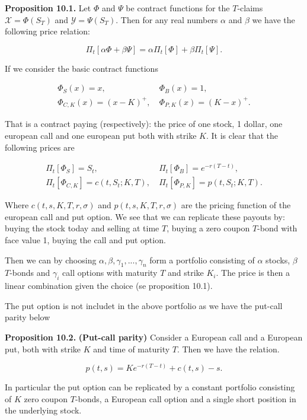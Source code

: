 \documentclass[
]{article}
\begin{document}
\textbf{Proposition 10.1.} Let \(\Phi\) and \(\Psi\) be contract
functions for the \(T\)-claims \(\mathcal{X}=\Phi(S_T)\) and
\(\mathcal{Y}=\Psi(S_T)\). Then for any real numbers \(\alpha\) and
\(\beta\) we have the following price relation:

\[
\Pi_t[\alpha \Phi + \beta\Psi]=\alpha \Pi_t[\Phi]+\beta\Pi_t[\Psi].
\]

If we consider the basic contract functions

\begin{align*}
\Phi_S(x)=x,&\ \Phi_B(x)=1,\\
\Phi_{C,K}(x)=(x-K)^+,&\ \Phi_{P,K}(x)=(K-x)^+.
\end{align*}

That is a contract paying (respectively): the price of one stock, 1
dollar, one european call and one european put both with strike \(K\).
It is clear that the following prices are

\begin{align*}
\Pi_t[\Phi_S]=S_t,&\ \Pi_t[\Phi_B]=e^{-r(T-t)},\\
\Pi_t[\Phi_{C,K}]=c(t,S_t;K,T),&\ \Pi_t[\Phi_{P,K}]=p(t,S_t;K,T).
\end{align*}

Where \(c(t,s,K,T,r,\sigma)\) and \(p(t,s,K,T,r,\sigma)\) are the
pricing function of the european call and put option. We see that we can
replicate these payouts by: buying the stock today and selling at time
\(T\), buying a zero coupon \(T\)-bond with face value 1, buying the
call and put option.

Then we can by choosing \(\alpha,\beta,\gamma_1,...,\gamma_n\) form a
portfolio consisting of \(\alpha\) stocks, \(\beta\) \(T\)-bonds and
\(\gamma_i\) call options with maturity \(T\) and strike \(K_i\). The
price is then a linear combination given the choice (se proposition
10.1).

The put option is not includet in the above portfolio as we have the
put-call parity below

\textbf{Proposition 10.2.} \textbf{(Put-call parity)} Consider a
European call and a European put, both with strike \(K\) and time of
maturity \(T\). Then we have the relation.

\[
p(t,s) = Ke^{-r(T-t)}+c(t,s)-s.
\]

In particular the put option can be replicated by a constant portfolio
consisting of \(K\) zero coupon \(T\)-bonds, a European call option and
a single short position in the underlying stock.
\end{document}
